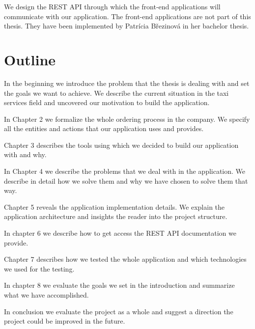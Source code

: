 We design the REST API through which the front-end applications will communicate with our application. The front-end applications are not part of this thesis. They have been implemented by Patrícia Březinová in her bachelor thesis.


\section{Outline}
In the beginning we introduce the problem that the thesis is dealing with and set the goals we want to achieve. We describe the current situation in the taxi services field and uncovered our motivation to build the application. 

In Chapter 2 we formalize the whole ordering process in the company. We specify all the entities and actions that our application uses and provides.

Chapter 3 describes the tools using which we decided to build our application with and why.

In Chapter 4 we describe the problems that we deal with in the application. We describe in detail how we solve them and why we have chosen to solve them that way.  

Chapter 5 reveals the application implementation details. We explain the application architecture and insights the reader into the project structure.

In chapter 6 we describe how to get access the REST API documentation we provide.

Chapter 7 describes how we tested the whole application and which technologies we used for the testing.

In chapter 8 we evaluate the goals we set in the introduction and summarize what we have accomplished.

In conclusion we evaluate the project as a whole and suggest a direction the project could be improved in the future. 